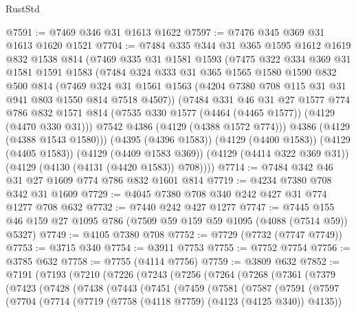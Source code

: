 \begin{lexlean}{RustStd}
\begin{coremodule}
{\begin{coremodule}
{{{{{{{{{{{{{{@7591 := @7469 @346 @31 @1613 @1622
@7597 := @7476 @345 @369 @31 @1613 @1620 @1521
@7704 := @7484
    @335
    @344
    @31
    @365
    @1595
    @1612
    @1619
    @832
    @1538
    @814
    (@7469
      @335
      @31
      @1581
      @1593
      (@7475
        @322
        @334
        @369
        @31
        @1581
        @1591
        @1583
        (@7484
          @324
          @333
          @31
          @365
          @1565
          @1580
          @1590
          @832
          @500
          @814
          (@7469
            @324
            @31
            @1561
            @1563
            (@4204 @7380 @708 @115 @31 @31 @941 @803 @1550 @814 @7518 @4507))
          (@7484
            @331
            @46
            @31
            @27
            @1577
            @774
            @786
            @832
            @1571
            @814
            (@7535 @330 @1577 (@4464 (@4465 @1577)) (@4129 (@4470 @330 @31)))
            @7542
            @4386
            (@4129 (@4388 @1572 @774)))
          @4386
          (@4129 (@4388 @1543 @1580)))
        (@4395 (@4396 @1583))
        (@4129 (@4400 @1583))
        (@4129 (@4405 @1583))
        (@4129 (@4409 @1583 @369))
        (@4129 (@4414 @322 @369 @31))
        (@4129 (@4130 (@4131 (@4420 @1583)) @708))))
@7714 := @7484 @342 @46 @31 @27 @1609 @774 @786 @832 @1601 @814
@7719 := @4234 @7380 @708 @342 @31 @1609
@7729 := @4045 @7380 @708 @340 @242 @427 @31 @774 @1277 @708 @632
@7732 := @7440 @242 @427 @1277
@7747 := @7445 @155 @46 @159 @27 @1095 @786 (@7509 @59 @159 @59 @1095 (@4088 (@7514 @59)) @5327)
@7749 := @4105 @7380 @708
@7752 := @7729 (@7732 (@7747 @7749))
@7753 := @3715 @340
@7754 := @3911 @7753
@7755 := @7752 @7754
@7756 := @3785 @632
@7758 := @7755 (@4114 @7756)
@7759 := @3809 @632
@7852 := @7191
    (@7193
      (@7210
        (@7226
          (@7243
            (@7256
              (@7264
                (@7268
                  (@7361
                    (@7379
                      (@7423
                        (@7428
                          (@7438
                            (@7443
                              (@7451
                                (@7459
                                  (@7581
                                    (@7587
                                      (@7591
                                        (@7597
                                          (@7704
                                            (@7714
                                              (@7719
                                                (@7758 (@4118 @7759) (@4123 (@4125 @340)) @4135))
}}}}}}}}}}}}}}
\end{coremodule}}
\end{coremodule}
\end{lexlean}
